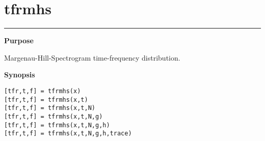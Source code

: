 

\section*{\hspace*{-1.6cm} tfrmhs}

\vspace*{-.4cm}
\hspace*{-1.6cm}\rule[0in]{16.5cm}{.02cm}
\vspace*{.2cm}

{\bf \large \sf Purpose}\\
\hspace*{1.5cm}
\begin{minipage}[t]{13.5cm}
Margenau-Hill-Spectrogram time-frequency distribution.
\end{minipage}
\vspace*{.5cm}

{\bf \large \sf Synopsis}\\
\hspace*{1.5cm}
\begin{minipage}[t]{13.5cm}
\begin{verbatim}
[tfr,t,f] = tfrmhs(x)
[tfr,t,f] = tfrmhs(x,t)
[tfr,t,f] = tfrmhs(x,t,N)
[tfr,t,f] = tfrmhs(x,t,N,g)
[tfr,t,f] = tfrmhs(x,t,N,g,h)
[tfr,t,f] = tfrmhs(x,t,N,g,h,trace)
\end{verbatim}
\end{minipage}
\vspace*{.5cm}

